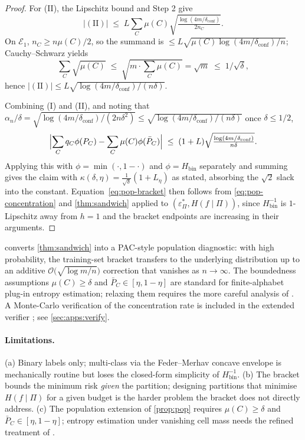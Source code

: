 \documentclass[10pt]{article}
\theoremstyle{definition}
\theoremstyle{remark}
\newcommand{\Hbin}{H_{\mathrm{bin}}}
\newcommand{\Hinv}{H_{\mathrm{bin}}^{-1}}
\newcommand{\eps}{\varepsilon}
\newcommand{\epsP}{\eps^{\!*}_{\Pi}}
\begin{document}
\begin{proof}
For (II), the Lipschitz bound and Step 2 give
\[
  |\mathrm{(II)}|
  \;\le\; L \sum_{C} \mu(C)
    \sqrt{\tfrac{\log(4m/\delta_{\mathrm{conf}})}{2 n_{C}}}.
\]
On $\mathcal{E}_{1}$, $n_{C} \ge n\mu(C)/2$, so the summand is
$\le L\sqrt{\mu(C) \log(4m/\delta_{\mathrm{conf}}) / n}$;
Cauchy--Schwarz yields
\[
  \sum_{C} \sqrt{\mu(C)}
  \;\le\; \sqrt{m \cdot \textstyle\sum_{C}\mu(C)} = \sqrt{m}
  \;\le\; 1/\sqrt{\delta},
\]
hence
\(
  |\mathrm{(II)}|
  \le L \sqrt{\log(4m/\delta_{\mathrm{conf}}) / (n\delta)}.
\)

Combining (I) and (II), and noting that
$\alpha_{n}/\delta = \sqrt{\log(4m/\delta_{\mathrm{conf}}) /
  (2n\delta^{2})}
  \le \sqrt{\log(4m/\delta_{\mathrm{conf}}) / (n\delta)}$
once $\delta \le 1/2$,
\[
  \Bigl|\sum_{C} q_{C}\phi(P_{C})
    - \sum_{C} \mu(C)\phi(\bar P_{C})\Bigr|
  \;\le\; (1 + L)\sqrt{\tfrac{\log(4m/\delta_{\mathrm{conf}})}{n\delta}}.
\]
Applying this with $\phi = \min(\cdot, 1-\cdot)$ and
$\phi = \Hbin$ separately and summing gives the claim with
$\kappa(\delta, \eta) = \tfrac{1}{\sqrt{\delta}}(1 + L_{\eta})$
as stated, absorbing the $\sqrt{2}$ slack into the constant.
Equation~\eqref{eq:pop-bracket} then follows from
\eqref{eq:pop-concentration}
and \cref{thm:sandwich} applied to $(\epsP, H(f\mid\Pi))$, since
$\Hinv$ is $1$-Lipschitz away from $h = 1$ and the bracket
endpoints are increasing in their arguments.
\end{proof}

 converts \cref{thm:sandwich} into a PAC-style
population diagnostic: with high probability, the training-set
bracket transfers to the underlying distribution up to an
additive $\mathcal{O}\bigl(\sqrt{\log m / n}\bigr)$ correction
that vanishes as $n \to \infty$. The boundedness assumptions
$\mu(C) \ge \delta$ and $\bar P_{C} \in [\eta, 1-\eta]$ are
standard for finite-alphabet plug-in entropy estimation; relaxing
them requires the more careful analysis of
\citet{antos2001convergence}. A Monte-Carlo verification of the
concentration rate is included in the extended verifier
; see \cref{sec:apps:verify}.

\paragraph{Limitations.} (a) Binary labels only; multi-class via
the Feder--Merhav concave envelope is mechanically routine but
loses the closed-form simplicity of $\Hinv$. (b) The bracket
bounds the minimum risk \emph{given} the partition; designing
partitions that minimise $H(f \mid \Pi)$ for a given budget is
the harder problem the bracket does not directly address.
(c) The population extension of \cref{prop:pop} requires
$\mu(C) \ge \delta$ and $\bar P_{C} \in [\eta, 1-\eta]$; entropy
estimation under vanishing cell mass needs the refined treatment
of \citet{antos2001convergence}.
\end{document}
